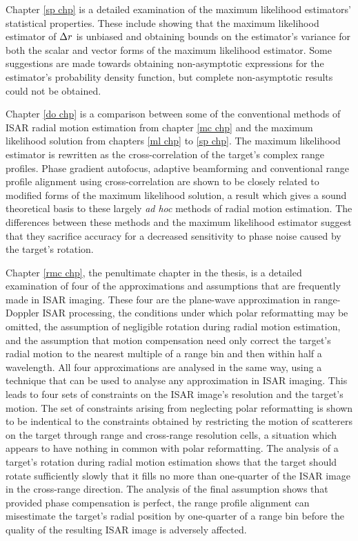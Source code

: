 Chapter \ref{sp chp} is a detailed examination of the maximum likelihood
estimators' statistical properties.  These include showing that the maximum
likelihood estimator of ${\Delta r}$ is unbiased and obtaining bounds on the 
estimator's variance for both the scalar and vector forms of the maximum
likelihood estimator.  Some suggestions are made towards obtaining
non-asymptotic expressions for the estimator's probability
density function, but complete non-asymptotic results could not be
obtained.

Chapter \ref{do chp} is a comparison between some of the conventional
methods of ISAR radial motion estimation from chapter \ref{mc chp} and the
maximum likelihood solution from chapters \ref{ml chp} to \ref{sp chp}.
The maximum likelihood estimator is rewritten as the cross-correlation of
the target's complex range profiles.  Phase gradient autofocus, adaptive
beamforming and conventional range profile alignment using
cross-correlation are shown to be closely related to modified forms 
of the maximum likelihood solution, a result which gives a sound
theoretical basis to these largely {\em ad hoc\/} methods of radial motion
estimation.  The differences between these methods and the maximum 
likelihood estimator suggest that they sacrifice accuracy for a decreased
sensitivity to phase noise caused by the target's rotation.


Chapter \ref{rmc chp}, the penultimate chapter in the thesis, is a detailed
examination of four of the approximations and assumptions that are
frequently made in ISAR imaging.  These four are the plane-wave
approximation in range-Doppler ISAR processing, the conditions under which
polar reformatting may be omitted, the assumption of negligible rotation
during radial motion estimation, and the assumption that motion
compensation need only correct the target's radial motion to the nearest
multiple of a range bin and then within half a wavelength.  All four
approximations are analysed in the same way, using a technique that can be
used to analyse any approximation in ISAR imaging.  This leads to four sets
of constraints on the ISAR image's resolution and the target's motion.  The
set of constraints arising from neglecting polar reformatting is shown to
be indentical to the constraints obtained by restricting the motion of
scatterers on the target through range and cross-range resolution cells, a
situation which appears to have nothing in common with polar reformatting. 
The analysis of a target's rotation during radial motion estimation shows
that the target should rotate sufficiently slowly that it fills no more
than one-quarter of the ISAR image in the cross-range direction.  The
analysis of the final assumption shows that provided phase compensation is
perfect, the range profile alignment can misestimate the target's radial
position by one-quarter of a range bin before the quality of the resulting
ISAR image is adversely affected.

